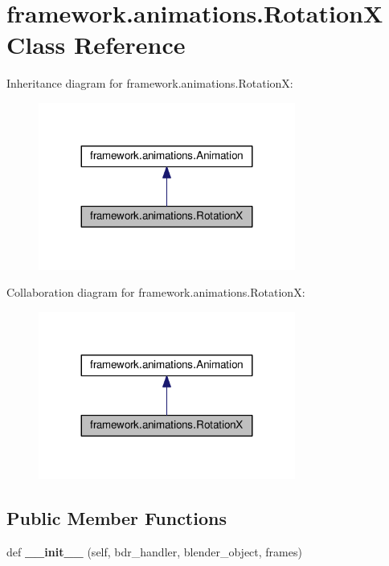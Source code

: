 \hypertarget{classframework_1_1animations_1_1RotationX}{}\section{framework.\+animations.\+RotationX Class Reference}
\label{classframework_1_1animations_1_1RotationX}


Inheritance diagram for framework.\+animations.\+RotationX\+:
\nopagebreak
\begin{figure}[H]
\begin{center}
\leavevmode
\includegraphics[width=239pt]{classframework_1_1animations_1_1RotationX__inherit__graph}
\end{center}
\end{figure}


Collaboration diagram for framework.\+animations.\+RotationX\+:
\nopagebreak
\begin{figure}[H]
\begin{center}
\leavevmode
\includegraphics[width=239pt]{classframework_1_1animations_1_1RotationX__coll__graph}
\end{center}
\end{figure}
\subsection*{Public Member Functions}
\begin{DoxyCompactItemize}
\item 
def {\bfseries \+\_\+\+\_\+init\+\_\+\+\_\+} (self, bdr\+\_\+handler, blender\+\_\+object, frames)\hypertarget{classframework_1_1animations_1_1RotationX_ab2109fd69ef8a189f9d4b062fb6825f3}{}\label{classframework_1_1animations_1_1RotationX_ab2109fd69ef8a189f9d4b062fb6825f3}

\end{DoxyCompactItemize}
